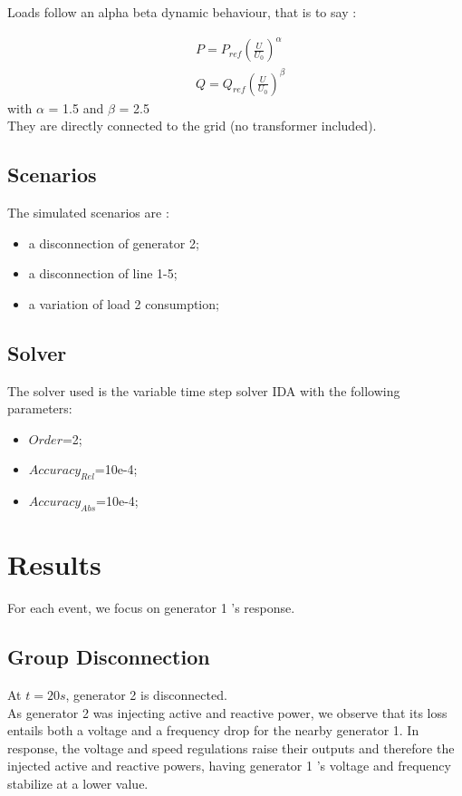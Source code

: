 \documentclass[a4paper, 12pt]{report}
\begin{document}
Loads follow an alpha beta dynamic behaviour, that is to say :

\[
\begin{aligned}
& P = P_{ref} (\frac{U}{U_{0}})^\alpha \\
& Q = Q_{ref} (\frac{U}{U_{0}})^\beta
\end{aligned}
\]
with $\alpha$ = 1.5 and $\beta$ = 2.5 \\
They are directly connected to the grid (no transformer included).


\subsection{Scenarios}
The simulated scenarios are :
\begin{itemize}
\item a disconnection of generator 2;
\item a disconnection of line 1-5;
\item a variation of load 2 consumption;
\end{itemize}

\subsection{Solver}
The solver used is the variable time step solver IDA with the following parameters:
\begin{itemize}
\item $Order$=2;
\item $Accuracy_{Rel}$=10e-4;
\item $Accuracy_{Abs}$=10e-4;
\end{itemize}


\newpage
\section{Results}

For each event, we focus on generator 1 's response.

\subsection*{Group Disconnection}

At $t=20s$, generator 2 is disconnected.\\

As generator 2 was injecting active and reactive power, we observe that its loss entails both a voltage and a frequency drop for the nearby generator 1. In response, the voltage and speed regulations raise their outputs and therefore the injected active and reactive powers, having generator 1 's voltage and frequency stabilize at a lower value.\\
\end{document}

